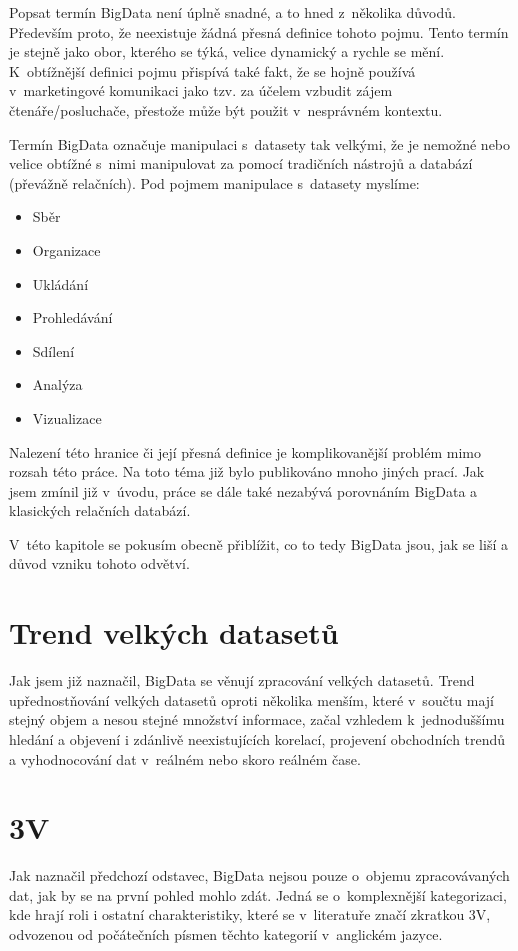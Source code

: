 

Popsat termín BigData není úplně snadné, a to hned z~několika důvodů. Především proto, že neexistuje žádná přesná definice tohoto pojmu. Tento termín je stejně jako obor, kterého se týká, velice dynamický a rychle se mění. K~obtížnější definici pojmu přispívá také fakt, že se hojně používá v~marketingové komunikaci jako tzv.  za účelem vzbudit zájem čtenáře/posluchače, přestože může být použit v~nesprávném kontextu.

Termín BigData označuje manipulaci s~datasety tak velkými, že je nemožné nebo velice obtížné s~nimi manipulovat za pomocí tradičních nástrojů a databází (převážně relačních). Pod pojmem manipulace s~datasety myslíme:

\begin{itemize}
  \item Sběr
  \item Organizace
  \item Ukládání
 \item Prohledávání
 \item Sdílení
 \item Analýza
 \item Vizualizace
\end{itemize}

Nalezení této hranice či její přesná definice je komplikovanější problém mimo rozsah této práce. Na toto téma již bylo publikováno mnoho jiných prací. Jak jsem zmínil již v~úvodu, práce se dále také nezabývá porovnáním BigData a klasických relačních databází. 

V~této kapitole se pokusím obecně přiblížit, co to tedy BigData jsou, jak se liší a důvod vzniku tohoto odvětví.


\section{Trend velkých datasetů}
Jak jsem již naznačil, BigData se věnují zpracování velkých datasetů. Trend upřednostňování velkých datasetů oproti několika menším, které v~součtu mají stejný objem a nesou stejné množství informace, začal vzhledem k~jednoduššímu hledání a objevení i zdánlivě neexistujících korelací, projevení obchodních trendů a vyhodnocování dat v~reálném nebo skoro reálném čase.

\section{3V}
Jak naznačil předchozí odstavec, BigData nejsou pouze o~objemu zpracovávaných dat, jak by se na první pohled mohlo zdát. Jedná se o~komplexnější kategorizaci, kde hrají roli i ostatní charakteristiky, které se v~literatuře značí zkratkou 3V, odvozenou od počátečních písmen těchto kategorií v~anglickém jazyce.

